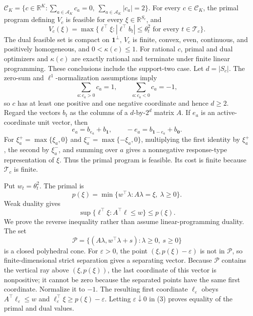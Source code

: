\(\mathcal C_K=\{c\in\mathbb R^K: \sum_{a\in\mathcal A_K}c_a=0,\ \sum_{a\in\mathcal A_K}|c_a|=2\}\).
For every \(c\in\mathcal C_K\), the primal program defining \(V_c\) is feasible for every \(\xi\in\mathbb R^{S_c}\), and
\[
V_c(\xi)=\max\{\ell^\top\xi:|\ell^\top b_t|\le\theta_t^2\text{ for every }t\in\mathcal T_c\}.
\]
The dual feasible set is compact on \(\mathbf 1^\perp\), \(V_c\) is finite, convex, even, continuous, and positively homogeneous, and \(0<\kappa(c)\le1\). For rational \(c\), primal and dual optimizers and \(\kappa(c)\) are exactly rational and terminate under finite linear programming. These conclusions include the support-two case.
Let \(d=|S_c|\).  The zero-sum and \(\ell^1\)-normalization assumptions imply
\[
\sum_{a:c_a>0}c_a=1,
\qquad
\sum_{a:c_a<0}c_a=-1,
\tag{1}
\]
so \(c\) has at least one positive and one negative coordinate and hence \(d\ge2\).  Regard the vectors \(b_t\) as the columns of a \(d\)-by-\(2^d\) matrix \(A\).  If \(e_a\) is an active-coordinate unit vector, then
\[
e_a=b_{e_a}+b_{\mathbf 1},
\qquad
-e_a=b_{\mathbf 1-e_a}+b_{\mathbf 0}.
\tag{2}
\]
For \(\xi_a^+=\max\{\xi_a,0\}\) and \(\xi_a^-=\max\{-\xi_a,0\}\), multiplying the first identity by \(\xi_a^+\), the second by \(\xi_a^-\), and summing over \(a\) gives a nonnegative response-type representation of \(\xi\).  Thus the primal program is feasible.  Its cost is finite because \(\mathcal T_c\) is finite.

Put \(w_t=\theta_t^2\).  The primal is
\[
p(\xi)=\min\{w^\top\lambda:A\lambda=\xi,\ \lambda\ge0\}.
\]
Weak duality gives
\[
\sup\{\ell^\top\xi:A^\top\ell\le w\}\le p(\xi).
\tag{3}
\]
We prove the reverse inequality rather than assume linear-programming duality.  The set
\[
\mathcal P=\{(A\lambda,w^\top\lambda+s):\lambda\ge0,\ s\ge0\}
\]
is a closed polyhedral cone.  For \(\varepsilon>0\), the point \((\xi,p(\xi)-\varepsilon)\) is not in \(\mathcal P\), so finite-dimensional strict separation gives a separating vector.  Because \(\mathcal P\) contains the vertical ray above \((\xi,p(\xi))\), the last coordinate of this vector is nonpositive; it cannot be zero because the separated points have the same first coordinate.  Normalize it to \(-1\).  The resulting first coordinate \(\ell_\varepsilon\) obeys \(A^\top\ell_\varepsilon\le w\) and \(\ell_\varepsilon^\top\xi\ge p(\xi)-\varepsilon\).  Letting \(\varepsilon\downarrow0\) in (3) proves equality of the primal and dual values.

